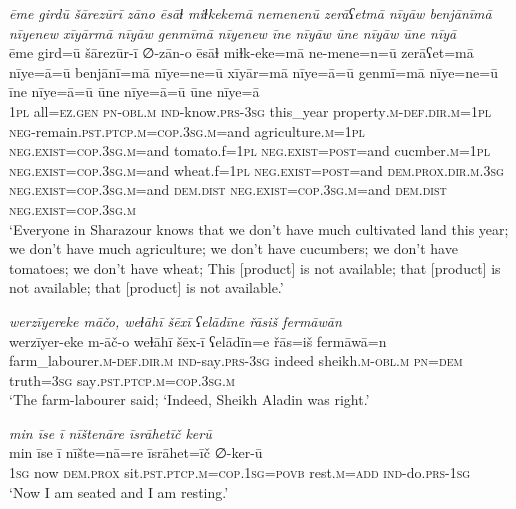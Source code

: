 \ea \label{PM.37}
\textit{ēme girdū šārezūrī zāno ēsāɫ miɫkekemā nemenenū zerāʕetmā nīyāw benjānīmā nīyenew xīyārmā nīyāw genmīmā nīyenew īne nīyāw ūne nīyāw ūne nīyā} \\ 
\gll ēme gird=ū šārezūr-ī ∅-zān-o ēsāɫ miɫk-eke=mā ne-mene=n=ū zerāʕet=mā nīye=ā=ū benjānī=mā nīye=ne=ū xīyār=mā nīye=ā=ū genmī=mā nīye=ne=ū īne nīye=ā=ū ūne nīye=ā=ū ūne nīye=ā \\ 
 \textsc{1pl} all\textsc{\textsc{=ez.gen}} \textsc{pn}\textsc{-obl}\textsc{.m} \textsc{ind-}know\textsc{.prs}\textsc{-3sg} this\_year property\textsc{.m}\textsc{-def}\textsc{.dir}\textsc{.m}\textsc{=1pl} \textsc{neg-}remain\textsc{.pst}\textsc{.ptcp}\textsc{.m}\textsc{=cop}\textsc{.3sg}\textsc{.m}=and agriculture\textsc{.m}\textsc{=1pl} \textsc{\textsc{neg.}exist}\textsc{=cop}\textsc{.3sg}\textsc{.m}=and tomato.f\textsc{=1pl} \textsc{\textsc{neg.}exist}\textsc{=\textsc{post}}=and cucmber\textsc{.m}\textsc{=1pl} \textsc{\textsc{neg.}exist}\textsc{=cop}\textsc{.3sg}\textsc{.m}=and wheat.f\textsc{=1pl} \textsc{\textsc{neg.}exist}\textsc{=\textsc{post}}=and \textsc{dem.prox}\textsc{.dir}\textsc{.m}\textsc{.3sg} \textsc{\textsc{neg.}exist}\textsc{=cop}\textsc{.3sg}\textsc{.m}=and \textsc{dem.dist} \textsc{\textsc{neg.}exist}\textsc{=cop}\textsc{.3sg}\textsc{.m}=and \textsc{dem.dist} \textsc{\textsc{neg.}exist}\textsc{=cop}\textsc{.3sg}\textsc{.m} \\ 
\glt `Everyone in Sharazour knows that we don’t have much cultivated land this year; we don’t have much agriculture; we don’t have cucumbers; we don’t have tomatoes; we don’t have wheat; This [product] is not available; that [product] is not available; that [product] is not available.'
\z 
 
\ea \label{PM.44}
\textit{werzīyereke māčo, weɫāhī šēxī ʕelādīne řāsiš fermāwān} \\ 
\gll werzīyer-eke m-āč-o weɫāhī šēx-ī ʕelādīn=e řās=iš fermāwā=n \\ 
 farm\_labourer\textsc{.m}\textsc{-def}\textsc{.dir}\textsc{.m} \textsc{ind-}say\textsc{.prs}\textsc{-3sg} indeed sheikh\textsc{.m}\textsc{-obl}\textsc{.m} \textsc{pn}\textsc{=dem} truth\textsc{=3sg} say\textsc{.pst}\textsc{.ptcp}\textsc{.m}\textsc{=cop}\textsc{.3sg}\textsc{.m} \\ 
\glt `The farm-labourer said; ‘Indeed, Sheikh Aladin was right.'
\z 
 
\ea \label{PM.45}
\textit{min īse ī nīštenāre īsrāhetīč kerū} \\ 
\gll min īse ī nīšte=nā=re īsrāhet=īč ∅-ker-ū \\ 
 \textsc{1sg} now \textsc{dem.prox} sit\textsc{.pst}\textsc{.ptcp}\textsc{.m}\textsc{=cop}\textsc{.\textsc{1sg}}\textsc{=\textsc{povb}} rest\textsc{.m}\textsc{=add} \textsc{ind-}do\textsc{.prs}\textsc{-\textsc{1sg}} \\ 
\glt `Now I am seated and I am resting.'
\z 
 
